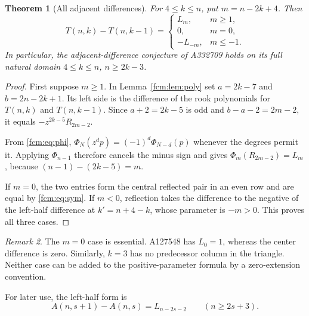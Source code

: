 \documentclass[11pt,letterpaper]{article}
\newtheorem{theorem}{Theorem}[section]
\theoremstyle{remark}\newtheorem{remark}[theorem]{Remark}
\begin{document}
\begin{theorem}[All adjacent differences]\label{fcm:thm:difference}
For $4\le k\le n$, put $m=n-2k+4$. Then
\begin{equation}\label{fcm:eq:all-difference}
 T(n,k)-T(n,k-1)=
 \begin{cases} L_m,&m\ge1,\\0,&m=0,\\-L_{-m},&m\le-1.\end{cases}
\end{equation}
In particular, the adjacent-difference conjecture of A332709 holds on its full natural domain $4\le k\le n$, $n\ge2k-3$.
\end{theorem}
\begin{proof}
First suppose $m\ge1$. In Lemma~\ref{fcm:lem:poly} set $a=2k-7$ and $b=2n-2k+1$. Its left side is the difference of the rook polynomials for $T(n,k)$ and $T(n,k-1)$. Since $a+2=2k-5$ is odd and $b-a-2=2m-2$, it equals $-z^{2k-5}R_{2m-2}$.

From \eqref{fcm:eq:phi}, $\Phi_N(z^dp)=(-1)^d\Phi_{N-d}(p)$ whenever the degrees permit it. Applying $\Phi_{n-1}$ therefore cancels the minus sign and gives $\Phi_m(R_{2m-2})=L_m$, because $(n-1)-(2k-5)=m$.

If $m=0$, the two entries form the central reflected pair in an even row and are equal by \eqref{fcm:eq:sym}. If $m<0$, reflection takes the difference to the negative of the left-half difference at $k'=n+4-k$, whose parameter is $-m>0$. This proves all three cases.
\end{proof}
\begin{remark}
The $m=0$ case is essential. A127548 has $L_0=1$, whereas the center difference is zero. Similarly, $k=3$ has no predecessor column in the triangle. Neither case can be added to the positive-parameter formula by a zero-extension convention.
\end{remark}
For later use, the left-half form is
\begin{equation}\label{fcm:eq:A-diff}
 A(n,s+1)-A(n,s)=L_{n-2s-2}\qquad(n\ge2s+3).
\end{equation}
\end{document}
